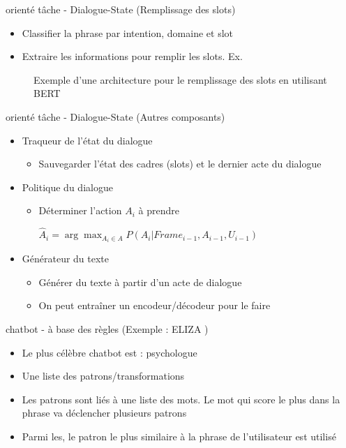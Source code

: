 \documentclass{KodeBook}
\begin{document}
orienté tâche - Dialogue-State (Remplissage des slots)
\begin{itemize}
	\item Classifier la phrase par intention, domaine et slot
	\item Extraire les informations pour remplir les slots. Ex. 
\end{itemize}

\begin{figure}
	\centering
	\caption{Exemple d'une architecture pour le remplissage des slots en utilisant BERT \cite{2020-jurafsky-martin}}
\end{figure}

orienté tâche - Dialogue-State (Autres composants)
\begin{itemize}
	\item Traqueur de l'état du dialogue
	\begin{itemize}
		\item Sauvegarder l'état des cadres (slots) et le dernier acte du dialogue
	\end{itemize}
	\item Politique du dialogue
	\begin{itemize}
		\item Déterminer l'action $A_i$ à prendre 
		
		$\hat{A}_i = \arg\max_{A_i \in A} P(A_i | Frame_{i-1}, A_{i-1}, U_{i-1})$
	\end{itemize}
	
	\item Générateur du texte 
	\begin{itemize}
		\item Générer du texte à partir d'un acte de dialogue
		\item On peut entraîner un encodeur/décodeur pour le faire
	\end{itemize}
\end{itemize}

chatbot - à base des règles (Exemple : ELIZA \cite{1966-Weizenbaum})
\begin{itemize}
	\item Le plus célèbre chatbot est  : psychologue
	\item Une liste des patrons/transformations 
	
	
	
	\item Les patrons sont liés à une liste des mots. Le mot qui score le plus dans la phrase va déclencher plusieurs patrons
	
	\item Parmi les, le patron le plus similaire à la phrase de l'utilisateur est utilisé
\end{itemize}
\end{document}

